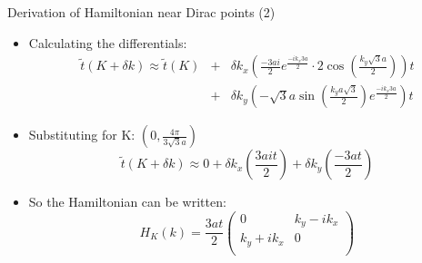 \documentclass{beamer}
\begin{document}
\begin{frame}[t]{Derivation of Hamiltonian near Dirac points (2)}
\begin{itemize}
\item Calculating the differentials:
\begin{eqnarray*}
 \tilde t(K+\delta k) \approx \tilde t(K) &+& \delta k_x \left ( \frac{-3ai}{2} e^{\frac{-ik_x 3a}{2}} \cdot 2 \cos \left (\frac{k_y \sqrt{3}a}{2} \right ) \right )t\\& + &\delta k_y \left (-\sqrt{3} a \sin \left (\frac{k_y a \sqrt{3}}{2} \right ) e^{\frac{-ik_x 3a}{2}} \right )t 
 \end{eqnarray*}
 \item Substituting for K: $\left (0, \frac{4\pi}{3\sqrt{3}a} \right)$
 \begin{equation}
  \tilde t(K+\delta k) \approx 0 + \delta k_x \left ( \frac{3ait}{2} \right ) + \delta k_y \left (\frac{-3at}{2} \right )
  \end{equation}
  \item So the Hamiltonian can be written:
  \begin{equation}
  H_K (k) = \frac{3at}{2}\left ( \begin{array}{cc}
  0 & k_y - i k_x\\ 
  k_y + ik_x & 0\\ \end{array} \right )
  \end{equation}
\end{itemize}
\end{frame}
\end{document}

